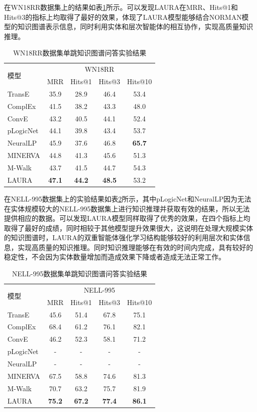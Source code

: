 \documentclass[algorithmlist, AutoFakeBold, AutoFakeSlant, figurelist, tablelist, nomlist, engineering]{seuthesix}
\begin{document}
在WN18RR数据集上的结果如表\ref{Experiment2_WN18RR}所示。可以发现LAURA在MRR、Hits@1和Hits@3的指标上均取得了最好的效果，体现了LAURA模型能够结合NORMAN模型的知识图谱表示信息，同时利用实体和层次智能体的相互协作，实现高质量知识推理。
\begin{table}[]
  \centering
  \begin{tabular*}{0.95\textwidth}{@{\extracolsep{\fill}}lcccc}
  \toprule[1pt]
  \multirow{2}{*}{模型} & \multicolumn{4}{c}{WN18RR}   \\
    & MRR & Hits@1 & Hits@3 & Hits@10 \\ \hline
  TransE & 35.9 & 28.9 & 46.4 & 53.4 \\
  ComplEx & 41.5 & 38.2 & 43.3 & 48.0 \\
  ConvE & 43.2 & 40.5 & 44.1 & 52.4 \\
  pLogicNet & 44.1 & 39.8 & 43.4 & 53.7 \\
  NeuralLP & 45.9 & 37.6 & 46.8 & \textbf{65.7} \\
  MINERVA & 44.8 & 41.3 & 45.6 & 51.3 \\
  M-Walk & 43.7 & 41.5 & 44.7 & 54.3 \\
  LAURA & \textbf{47.1} & \textbf{44.2} & \textbf{48.5} & 53.2 \\
  \bottomrule[1pt]
  \end{tabular*}
  \caption{WN18RR数据集单跳知识图谱问答实验结果}
  \label{Experiment2_WN18RR}
\end{table}

在NELL-995数据集上的实验结果如表\ref{Experiment2_NELL-995}所示，其中pLogicNet和NeuralLP因为无法在实体规模较大的NELL-995数据集上进行知识推理并获取有效的结果，所以无法提供相应的数据。可以发现LAURA模型同样取得了优秀的效果，在四个指标上均取得了最好的成绩，同时相较于其他模型提升效果很大，这说明在处理大规模实体的知识图谱时，LAURA的双重智能体强化学习结构能够较好的利用层次和实体信息，实现高质量的知识推理。同时知识推理能够在有效的时间内完成，具有较好的稳定性，不会因为实体数量增加而造成效果下降或者造成无法正常工作。
\begin{table}[]
  \centering
  \begin{tabular*}{0.95\textwidth}{@{\extracolsep{\fill}}lcccc}
  \toprule[1pt]
  \multirow{2}{*}{模型} & \multicolumn{4}{c}{NELL-995} \\
    & MRR & Hits@1 & Hits@3 & Hits@10 \\ \hline
  TransE & 45.6 & 51.4 & 67.8 & 75.1 \\
  ComplEx & 68.4 & 61.2 & 76.1 & 82.1 \\
  ConvE & 46.2 & 52.3 & 58.1 & 71.2 \\
  pLogicNet & - & - & - & - \\
  NeuralLP & - & - & - & - \\
  MINERVA & 67.5 & 58.8 & 74.6 & 81.3 \\
  M-Walk & 70.7 & 63.2 & 75.7 & 81.9 \\
  LAURA & \textbf{75.2} & \textbf{67.2} & \textbf{77.4} & \textbf{86.1} \\
  \bottomrule[1pt]
  \end{tabular*}
  \caption{NELL-995数据集单跳知识图谱问答实验结果}
  \label{Experiment2_NELL-995}
\end{table}
\end{document}
